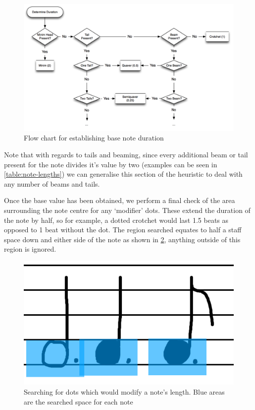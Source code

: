 \begin{figure}[H]
  \includegraphics[width=\linewidth]{gfx/implementation/duration-diagram.png}
  \caption{Flow chart for establishing base note duration}
  \label{fig:note-duration-flow-chart}
\end{figure}

Note that with regards to tails and beaming, since every additional beam or tail present for the note divides it's value by two (examples can be seen in \cref{table:note-lengths}) we can generalise this section of the heuristic to deal with any number of beams and tails.

Once the base value has been obtained, we perform a final check of the area surrounding the note centre for any `modifier' dots. These extend the duration of the note by half, so for example, a dotted crotchet would last 1.5 beats as opposed to 1 beat without the dot. The region searched equates to half a staff space down and either side of the note as shown in \cref{fig:identify-dot}, anything outside of this region is ignored.


\begin{figure}[H]
  \includegraphics[width=\linewidth]{gfx/implementation/dot-identification.png}
  \caption{Searching for dots which would modify a note's length. Blue areas are the searched space for each note}
  \label{fig:identify-dot}
\end{figure}
